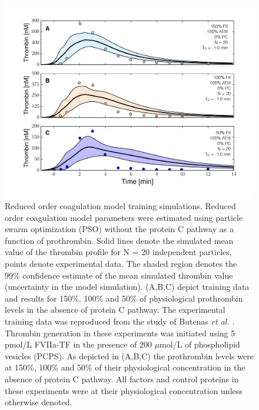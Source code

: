 \documentclass[processes,article,received,moreauthors,pdftex,12pt,a4paper]{mdpi}
\begin{document}
\begin{figure}[H]
\centering
\includegraphics[width=1.0\textwidth]{./figs/Figure-3-DIFF_FII_NO_APC.pdf}
\caption{Reduced order coagulation model training simulations.
Reduced order coagulation model parameters were estimated using particle swarm optimization (PSO) without the protein C pathway as a function of prothrombin. 
Solid lines denote the simulated mean value of the thrombin profile for N = 20 independent particles, points denote experimental data. 
The shaded region denotes the 99\% confidence estimate of the mean simulated thrombin value (uncertainty in the model simulation).
(A,B,C) depict training data and results for 150\%, 100\% and 50\% of physiological prothrombin levels in the absence of protein C pathway.
The experimental training data was reproduced from the study of Butenas \textit{et al.} \citep{Butenas:1999aa}.
Thrombin generation in these experiments was initiated using 5 pmol/L FVIIa-TF in the presence of 200 $\mu$mol/L of phospholipid vesicles (PCPS). 
As depicted in (A,B,C) the prothrombin levels were at 150\%, 100\% and 50\% of their physiological concentration in the absence of protein C pathway. 
All factors and control proteins in these experiments were at their physiological concentration unless otherwise denoted.}\label{fig-diff_fII_NO_APC} 
\end{figure}
\end{document}
